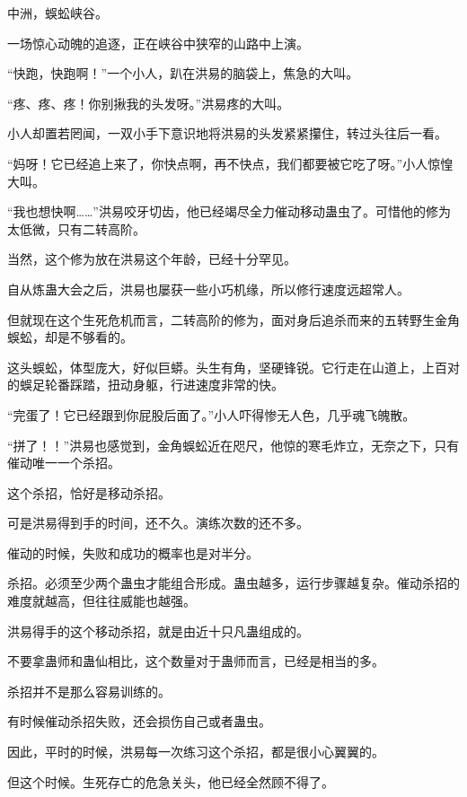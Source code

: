 
\begin{this_body}



中洲，蜈蚣峡谷。

一场惊心动魄的追逐，正在峡谷中狭窄的山路中上演。

“快跑，快跑啊！”一个小人，趴在洪易的脑袋上，焦急的大叫。

“疼、疼、疼！你别揪我的头发呀。”洪易疼的大叫。

小人却置若罔闻，一双小手下意识地将洪易的头发紧紧攥住，转过头往后一看。

“妈呀！它已经追上来了，你快点啊，再不快点，我们都要被它吃了呀。”小人惊惶大叫。

“我也想快啊……”洪易咬牙切齿，他已经竭尽全力催动移动蛊虫了。可惜他的修为太低微，只有二转高阶。

当然，这个修为放在洪易这个年龄，已经十分罕见。

自从炼蛊大会之后，洪易也屡获一些小巧机缘，所以修行速度远超常人。

但就现在这个生死危机而言，二转高阶的修为，面对身后追杀而来的五转野生金角蜈蚣，却是不够看的。

这头蜈蚣，体型庞大，好似巨蟒。头生有角，坚硬锋锐。它行走在山道上，上百对的蜈足轮番踩踏，扭动身躯，行进速度非常的快。

“完蛋了！它已经跟到你屁股后面了。”小人吓得惨无人色，几乎魂飞魄散。

“拼了！！”洪易也感觉到，金角蜈蚣近在咫尺，他惊的寒毛炸立，无奈之下，只有催动唯一一个杀招。

这个杀招，恰好是移动杀招。

可是洪易得到手的时间，还不久。演练次数的还不多。

催动的时候，失败和成功的概率也是对半分。

杀招。必须至少两个蛊虫才能组合形成。蛊虫越多，运行步骤越复杂。催动杀招的难度就越高，但往往威能也越强。

洪易得手的这个移动杀招，就是由近十只凡蛊组成的。

不要拿蛊师和蛊仙相比，这个数量对于蛊师而言，已经是相当的多。

杀招并不是那么容易训练的。

有时候催动杀招失败，还会损伤自己或者蛊虫。

因此，平时的时候，洪易每一次练习这个杀招，都是很小心翼翼的。

但这个时候。生死存亡的危急关头，他已经全然顾不得了。


\end{this_body}
